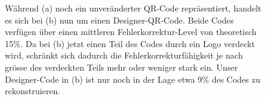 \begin{figure}
	\centering
	\caption{Während (a) noch ein unveränderter QR-Code repräsentiert, handelt es sich bei (b) nun um einen Designer-QR-Code. Beide Codes verfügen über einen mittleren Fehlerkorrektur-Level von theoretisch 15\%. Da bei (b) jetzt einen Teil des Codes durch ein Logo verdeckt wird, schränkt sich dadurch die Fehlerkorrekturfähigkeit je nach grösse des verdeckten Teils mehr oder weniger stark ein. Unser Designer-Code in (b) ist nur noch in der Lage etwa 9\% des Codes zu rekonstruieren.}
	\label{fig:designqr}
\end{figure}